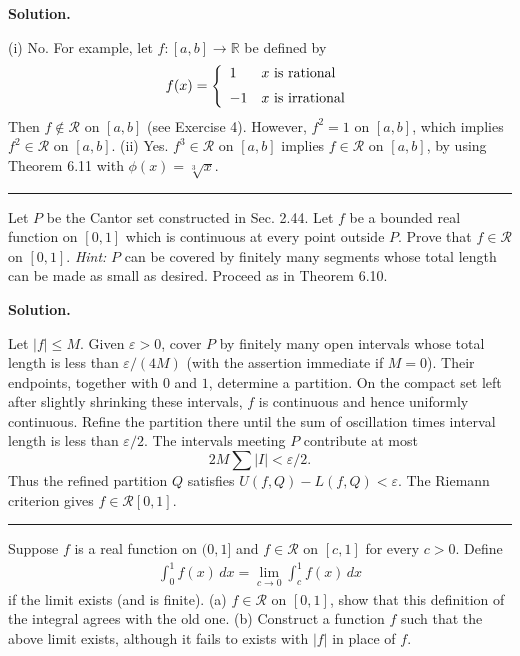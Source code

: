 \documentclass[12pt]{article}
\theoremstyle{definition}
\begin{document}
\smallskip
\noindent\textbf{Solution.}\quad

(i) No. For example, let $f:[a,b]\to \mathbb{R}$ be defined by
\begin{align*}
f(x)=\left\{\begin{array}{ll}
1&\mbox{$x$ is rational} \vspace{0.08in}\\
-1&\mbox{$x$ is irrational}
\end{array}\right.
\end{align*}
Then $f\notin\mathcal{R}$ on $[a,b]$ (see Exercise 4). However, $f^2=1$ on $[a,b]$, which implies $f^2\in\mathcal{R}$ on $[a,b]$.
(ii) Yes. $f^3\in\mathcal{R}$ on $[a,b]$ implies $f\in\mathcal{R}$ on $[a,b]$, by using Theorem 6.11 with $\phi(x)=\sqrt[3]{x}$.



\bigskip\noindent\hrule\bigskip

Let $P$ be the Cantor set constructed in Sec. 2.44. Let $f$ be a bounded real function on $[0,1]$ which is continuous at every point outside $P$. Prove that $f\in\mathcal{R}$ on $[0,1]$. \textit{Hint:} $P$ can be covered by finitely many segments whose total length can be made as small as desired. Proceed as in Theorem 6.10.

\smallskip
\noindent\textbf{Solution.}\quad


Let $|f|\le M$.  Given $\varepsilon>0$, cover $P$ by finitely many open intervals whose total length is less than $\varepsilon/(4M)$ (with the assertion immediate if $M=0$).  Their endpoints, together with $0$ and $1$, determine a partition.  On the compact set left after slightly shrinking these intervals, $f$ is continuous and hence uniformly continuous.  Refine the partition there until the sum of oscillation times interval length is less than $\varepsilon/2$.  The intervals meeting $P$ contribute at most
\[
 2M\sum |I|<\varepsilon/2.
\]
Thus the refined partition $Q$ satisfies $U(f,Q)-L(f,Q)<\varepsilon$.  The Riemann criterion gives $f\in\mathcal R[0,1]$.




\bigskip\noindent\hrule\bigskip

Suppose $f$ is a real function on $(0,1]$ and $f\in\mathcal{R}$ on $[c,1]$ for every $c>0$. Define
\begin{align*}
\int_0^1f(x)\,dx=\lim_{c\to 0}\int_c^1f(x)\,dx
\end{align*}
if the limit exists (and is finite).
(a) $f\in\mathcal{R}$ on $[0,1]$, show that this definition of the integral agrees with the old one.
(b) Construct a function $f$ such that the above limit exists, although it fails to exists with $\left\vert f\right\vert$ in place of $f$.
\end{document}

